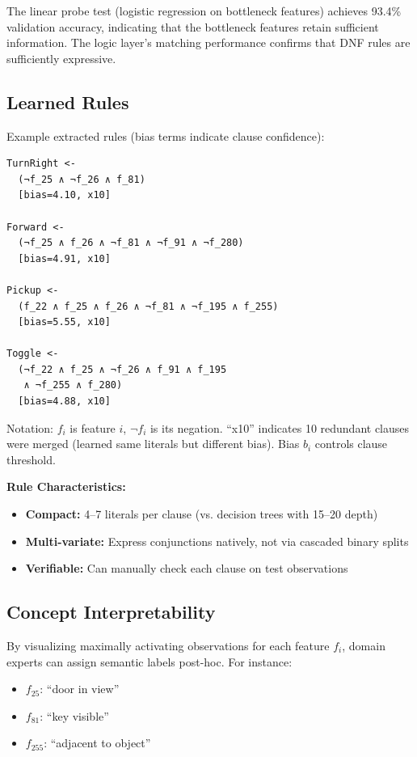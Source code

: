 \documentclass[11pt,twocolumn]{article}
\begin{document}
The linear probe test (logistic regression on bottleneck features) achieves 93.4\% validation accuracy, indicating that the bottleneck features retain sufficient information. The logic layer's matching performance confirms that DNF rules are sufficiently expressive.

\subsection{Learned Rules}

Example extracted rules (bias terms indicate clause confidence):

\begin{verbatim}
TurnRight <-
  (¬f_25 ∧ ¬f_26 ∧ f_81)
  [bias=4.10, x10]

Forward <-
  (¬f_25 ∧ f_26 ∧ ¬f_81 ∧ ¬f_91 ∧ ¬f_280)
  [bias=4.91, x10]

Pickup <-
  (f_22 ∧ f_25 ∧ f_26 ∧ ¬f_81 ∧ ¬f_195 ∧ f_255)
  [bias=5.55, x10]

Toggle <-
  (¬f_22 ∧ f_25 ∧ ¬f_26 ∧ f_91 ∧ f_195
   ∧ ¬f_255 ∧ f_280)
  [bias=4.88, x10]
\end{verbatim}

Notation: $f_i$ is feature $i$, $\neg f_i$ is its negation. ``x10'' indicates 10 redundant clauses were merged (learned same literals but different bias). Bias $b_i$ controls clause threshold.

\textbf{Rule Characteristics:}
\begin{itemize}
\item \textbf{Compact:} 4--7 literals per clause (vs. decision trees with 15--20 depth)
\item \textbf{Multi-variate:} Express conjunctions natively, not via cascaded binary splits
\item \textbf{Verifiable:} Can manually check each clause on test observations
\end{itemize}

\subsection{Concept Interpretability}

By visualizing maximally activating observations for each feature $f_i$, domain experts can assign semantic labels post-hoc. For instance:
\begin{itemize}
\item $f_{25}$: ``door in view''
\item $f_{81}$: ``key visible''
\item $f_{255}$: ``adjacent to object''
\end{itemize}
\end{document}

